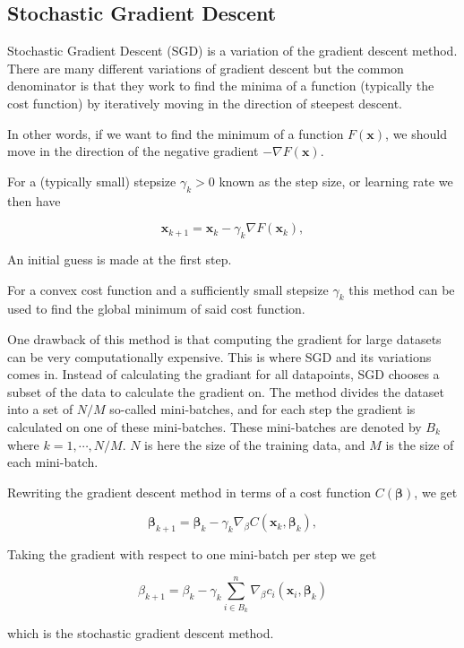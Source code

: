 \documentclass[11pt]{article}
\begin{document}
    \hypertarget{stochastic-gradient-descent}{%
\subsection{Stochastic Gradient
Descent}\label{stochastic-gradient-descent}}

Stochastic Gradient Descent (SGD) is a variation of the gradient descent
method. There are many different variations of gradient descent but the
common denominator is that they work to find the minima of a function
(typically the cost function) by iteratively moving in the direction of
steepest descent.

In other words, if we want to find the minimum of a function
\(F(\mathbf{x})\), we should move in the direction of the negative
gradient \(-\nabla F(\mathbf{x})\).

For a (typically small) stepsize \(\gamma_k > 0\) known as the step
size, or learning rate we then have

\[
\mathbf{x}_{k+1} = \mathbf{x}_k - \gamma_k \nabla F(\mathbf{x}_k),
\]

An initial guess is made at the first step.

For a convex cost function and a sufficiently small stepsize
\(\gamma_k\) this method can be used to find the global minimum of said
cost function.

One drawback of this method is that computing the gradient for large
datasets can be very computationally expensive. This is where SGD and
its variations comes in. Instead of calculating the gradiant for all
datapoints, SGD chooses a subset of the data to calculate the gradient
on. The method divides the dataset into a set of \(N/M\) so-called
mini-batches, and for each step the gradient is calculated on one of
these mini-batches. These mini-batches are denoted by \(B_k\) where
\(k=1,\cdots,N/M\). \(N\) is here the size of the training data, and
\(M\) is the size of each mini-batch.

Rewriting the gradient descent method in terms of a cost function
\(C(\mathbf{\beta})\), we get

\[
\mathbf{\beta}_{k+1} = \mathbf{\beta}_k - \gamma_k \nabla_{\beta} C(\mathbf{x}_k,\mathbf{\beta}_k),
\]

Taking the gradient with respect to one mini-batch per step we get

\[
\beta_{k+1} = \beta_k - \gamma_k \sum_{i \in B_k}^n \nabla_\beta c_i(\mathbf{x}_i,
\mathbf{\beta}_k)
\]

which is the stochastic gradient descent method.
\end{document}
